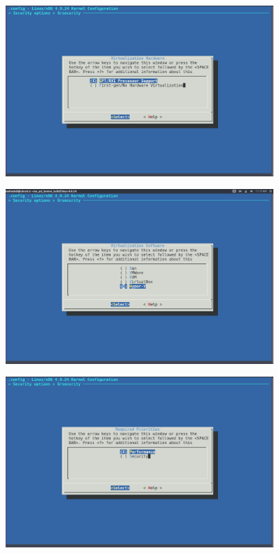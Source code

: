 \documentclass{article}
\begin{document}
\begin{enumerate}
\begin{figure}[ht]
\end{figure}
\begin{figure}[ht]
	\centering	
	\includegraphics[width = 0.9\textwidth]{images/8.png}
\end{figure}
\newpage
\begin{figure}[ht]
	\centering	
	\includegraphics[width = 0.9\textwidth]{images/9.png}
\end{figure}
\begin{figure}[ht]
	\centering	
	\includegraphics[width = 0.9\textwidth]{images/10.png}

\end{figure}
\end{enumerate}
\end{document}
